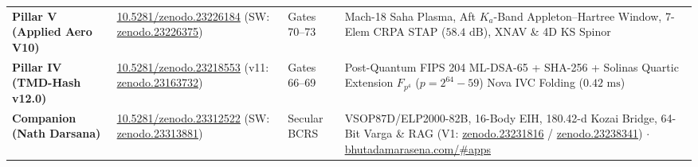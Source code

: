 \documentclass[11pt,a4paper,reqno]{article}
\def\texttt#1{#1}%
\def\mathbb#1{#1}%
\newcommand{\zenodo}[1]{\href{https://doi.org/10.5281/zenodo.#1}{\texttt{10.5281/\allowbreak zenodo.#1}}}
\newcommand{\zenodoshort}[1]{\href{https://doi.org/10.5281/zenodo.#1}{\texttt{zenodo.#1}}}
\newcommand{\appsportalshort}{\href{https://bhutadamarasena.com/\#apps}{\texttt{bhutadamarasena.com/\#apps}}}
\theoremstyle{plain}
\theoremstyle{definition}
\theoremstyle{remark}
\numberwithin{equation}{section}
\begin{document}
\begin{center}
{\begin{tabular}{@{}P{3.2cm}P{3.6cm}P{2.5cm}P{7.2cm}@{}}
\textbf{Pillar V (Applied Aero V10)} & \zenodo{23226184} (SW: \zenodoshort{23226375}) & \texttt{Gates 70--73} & Mach-18 Saha Plasma, Aft $K_a$-Band Appleton--Hartree Window, 7-Elem CRPA STAP ($58.4\text{ dB}$), XNAV \& 4D KS Spinor \\
\textbf{Pillar IV (TMD-Hash v12.0)} & \zenodo{23218553} (v11: \zenodoshort{23163732}) & \texttt{Gates 66--69} & Post-Quantum FIPS 204 ML-DSA-65 + SHA-256 + Solinas Quartic Extension $\mathbb{F}_{p^4}$ ($p=2^{64}-59$) Nova IVC Folding ($0.42\text{ ms}$) \\
\textbf{Companion (Nath Darsana)} & \zenodo{23312522} (SW: \zenodoshort{23313881}) & \texttt{Secular BCRS} & VSOP87D/ELP2000-82B, 16-Body EIH, 180.42-d Kozai Bridge, 64-Bit Varga \& RAG (V1: \zenodoshort{23231816} / \zenodoshort{23238341}) $\cdot$ \appsportalshort \\
\bottomrule
\end{tabular}%
}
\end{center}
\vspace{0.4em}

\clearpage
\end{document}
